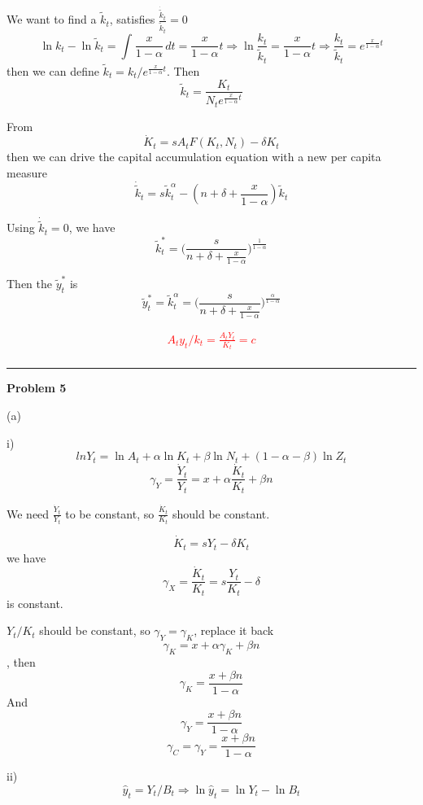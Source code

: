 \documentclass[letterpaper, 11pt]{article}
\newcommand{\1}{\mathds{1}}	%
\theoremstyle{definition}
\begin{document}
We want to find a $\tilde{k}_t$, satisfies $\frac{\dot{\tilde{k}}_t}{\tilde{k}_t} = 0$ \[
  \ln k_t - \ln \tilde{k}_t = \int_{}^{} \frac{x}{1-\alpha} \, dt = {\frac{x}{1-\alpha}t} \Longrightarrow \ln \frac{k_t}{\tilde{k}_t} = {\frac{x}{1-\alpha}t} \Longrightarrow \frac{k_t}{\tilde{k}_t} = e^{\frac{x}{1-\alpha}t}
\]
then we can define $\tilde{k}_t = {k_t}/{e^{\frac{x}{1-\alpha}t}}$. Then \[
  \tilde{k}_t = \frac{K_t}{N_t e^{\frac{x}{1-\alpha}t}}
\]

From \[
  \dot{K}_t = sA_tF(K_t,N_t) - \delta K_t
\] then we can drive the capital accumulation equation with a new per capita measure \[
  \dot{\tilde{k}}_t =  s \tilde{k}_t^\alpha - (n + \delta + \frac{x}{1-\alpha})\tilde{k}_t
\]

Using $\dot{\tilde{k}}_t  = 0$, we have \[
  \tilde{k}_t^* = \Big(\frac{s}{n + \delta + \frac{x}{1-\alpha}}\Big)^{\frac{1}{1-\alpha}}
\]

Then the $\tilde{y}_t^*$ is \[
  \tilde{y}_t^* = \tilde{k}_t^{\alpha} = \Big(\frac{s}{n + \delta + \frac{x}{1-\alpha}}\Big)^{\frac{\alpha}{1-\alpha}}
\]

\textcolor{red}{
\begin{align*}
    A_t y_t /k_t = \frac{A_t Y_t}{K_t} = c \\
\end{align*}
}



\bigskip
\hrule
\bigskip

\textbf{Problem 5}

(a)

i)
\[
  ln Y_t = \ln A_t + \alpha\ln K_t + \beta \ln N_t + (1-\alpha-\beta)\ln Z_t
\]
\[
  \gamma_Y = \frac{\dot{Y}_t}{Y_t} = x + \alpha \frac{\dot{K}_t}{K_t} + \beta n
\]

We need $\frac{\dot{Y}_t}{Y_t}$ to be constant, so $\frac{\dot{K}_t}{K_t}$ should be constant.

\[
  \dot{K}_t = s Y_t - \delta K_t
\] we have \[
  \gamma_X = \frac{\dot{K}_t}{K_t} = s \frac{Y_t}{K_t} - \delta
\] is constant.

$Y_t/K_t$ should be constant, so $\gamma_Y = \gamma_K$, replace it back \[
  \gamma_K = x + \alpha \gamma_K + \beta n
\] , then \[
  \gamma_K = \frac{x+\beta n}{1-\alpha}
\]
And \[
  \gamma_Y =  \frac{x+\beta n}{1-\alpha}
\]
\[
  \gamma_C = \gamma_Y =  \frac{x+\beta n}{1-\alpha}
\]


ii)
\[
  \hat{y}_t = Y_t/B_t \Longrightarrow \ln \hat{y}_t = \ln Y_t - \ln B_t
\]
\end{document}
